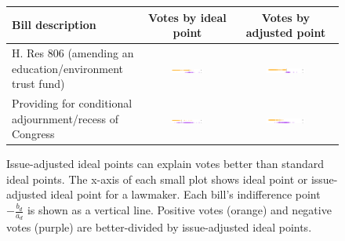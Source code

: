 \begin{figure} 
  \caption{Issue-adjusted ideal points can explain votes better than
  standard ideal points.  The x-axis of each small plot shows ideal
  point or issue-adjusted ideal point for a lawmaker. Each bill's
  indifference point $-\frac{b_d}{a_d}$ is shown as a vertical
  line. Positive votes (orange) and negative votes (purple) are
  better-divided by issue-adjusted ideal points.}
  \label{fig:issue_adjustments}
  \setlength{\extrarowheight}{1.5pt}
  \renewcommand{\arraystretch}{1.5}
  \hspace{-40pt} \begin{tabular}{|p{4.3cm}|c|c|}
\hline
\textbf{Bill description}
& \textbf{Votes by ideal point}
& \textbf{Votes by adjusted point} \\
\hline
H. Res 806 (amending an education/environment trust fund)
 & \includegraphics[width=0.4\textwidth]{chapter_spatial_voting_with_text/figures/3397_ideal_point_10.pdf}
 & \includegraphics[width=0.4\textwidth]{chapter_spatial_voting_with_text/figures/3397_adjusted_ideal_point_10.pdf} \\

Providing for conditional adjournment/recess of Congress
& \includegraphics[width=0.4\textwidth]{chapter_spatial_voting_with_text/figures/3397_ideal_point_9.pdf}
& \includegraphics[width=0.4\textwidth]{chapter_spatial_voting_with_text/figures/3397_adjusted_ideal_point_9.pdf} \\


\end{tabular}
\end{figure}
